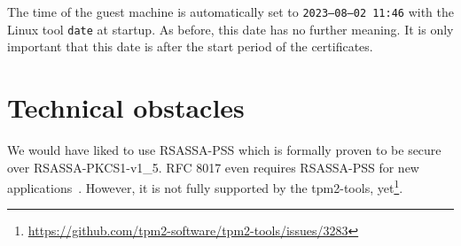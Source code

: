 The time of the guest machine is automatically set to \texttt{2023--08--02 11:46} with the Linux tool \texttt{date} at startup.
As before, this date has no further meaning.
It is only important that this date is after the start period of the certificates.

\section{Technical obstacles}

We would have liked to use RSASSA-PSS which is formally proven to be secure over RSASSA-PKCS1-v1\_5.
RFC 8017 even requires RSASSA-PSS for new applications~\cite{Moriarty2016}.
However, it is not fully supported by the tpm2-tools, yet\footnote{\url{https://github.com/tpm2-software/tpm2-tools/issues/3283}}.
